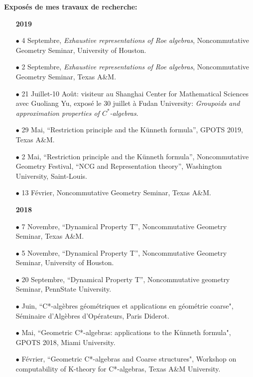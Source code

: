 \documentclass[a4paper,11pt]{article}
\newcommand\espace{\vrule height 20pt width 0pt}
\begin{document}
\textbf{Expos\'es de mes travaux de recherche:}\\

\begin{itemize}
\item[\textbf{2019}]
\item[$\bullet$] 4 Septembre, \textit{Exhaustive representations of Roe algebras}, Noncommutative Geometry Seminar, University of Houston.
\item[$\bullet$] 2 Septembre, \textit{Exhaustive representations of Roe algebras}, Noncommutative Geometry Seminar, Texas A\&M. 
\item[$\bullet$] 21 Juillet-10 Ao\^{u}t: visiteur au Shanghai Center for Mathematical Sciences avec Guoliang Yu, expos\'e le 30 juillet \`a Fudan University: \textit{Groupoids and approximation properties of $C^*$-algebras}. 
\item[$\bullet$] 29 Mai, ``Restriction principle and the Künneth formula'', GPOTS 2019, Texas A\&M.
\item[$\bullet$] 2 Mai, ``Restriction principle and the Künneth formula'', Noncommutative Geometry Festival, ``NCG and Representation theory'', Washington University, Saint-Louis.
\item[$\bullet$] 13 F\'evrier, Noncommutative Geometry Seminar, Texas A\&M.
\end{itemize}

\begin{itemize}
\item[\textbf{2018}]
\item[$\bullet$] 7 Novembre, ``Dynamical Property T'', Noncommutative Geometry Seminar, Texas A\&M.
\item[$\bullet$] 5 Novembre, ``Dynamical Property T'', Noncommutative Geometry Seminar, University of Houston.
\item[$\bullet$] 20 Septembre, ``Dynamical Property T'', Noncommutative geometry Seminar, PennState University.
\item[$\bullet$] Juin, ``C*-alg\`ebres g\'eom\'etriques et applications en g\'eom\'etrie coarse", Séminaire d'Algèbres d'Opérateurs, Paris Diderot.
\item[$\bullet$] Mai, ``Geometric C*-algebras: applications to the K\"unneth formula", GPOTS 2018, Miami University.
\item[$\bullet$] F\'evrier, ``Geometric C*-algebras and Coarse structures", Workshop on computability of K-theory for C*-algebras, Texas A\&M University.
\end{itemize}
\end{document}
